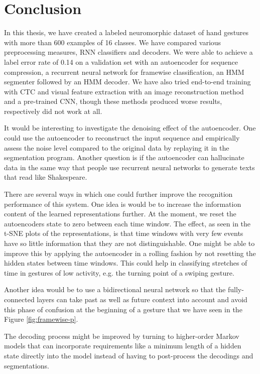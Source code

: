 \chapter{Conclusion}
\label{cha:conclusion}

In this thesis, we have created a labeled neuromorphic dataset of hand gestures
with more than 600 examples of 16 classes. We have compared various
preprocessing measures, RNN classifiers and decoders. We were able to achieve a
label error rate of 0.14 on a validation set with an autoencoder for sequence
compression, a recurrent neural network for framewise classification, an HMM
segmenter followed by an HMM decoder. We have also tried end-to-end training
with CTC and visual feature extraction with an image reconstruction method and a
pre-trained CNN, though these methods produced worse results, respectively did
not work at all.

It would be interesting to investigate the denoising effect of the autoencoder.
One could use the autoencoder to reconstruct the input sequence and empirically
assess the noise level compared to the original data by replaying it in the
segmentation program. Another question is if the autoencoder can hallucinate
data in the same way that people use recurrent neural networks to generate texts
that read like Shakespeare.

There are several ways in which one could further improve the recognition
performance of this system. One idea is would be to increase the information
content of the learned representations further. At the moment, we reset the
autoencoders state to zero between each time window. The effect, as seen in the
t-SNE plots of the representations, is that time windows with very few events
have so little information that they are not distinguishable. One might be able
to improve this by applying the autoencoder in a rolling fashion by not
resetting the hidden states between time windows. This could help in classifying
stretches of time in gestures of low activity, e.g. the turning point of a
swiping gesture.

Another idea would be to use a bidirectional neural network so that the
fully-connected layers can take past as well as future context into account and
avoid this phase of confusion at the beginning of a gesture that we have seen in
the Figure \ref{fig:framewise-p}.

The decoding process might be improved by turning to higher-order Markov models
that can incorporate requirements like a minimum length of a hidden state
directly into the model instead of having to post-process the decodings and
segmentations.

